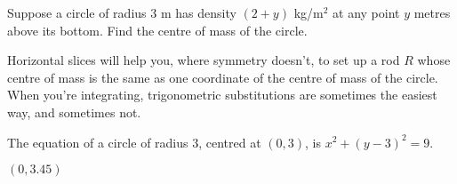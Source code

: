

\begin{question}
Suppose a circle of radius 3 m has density $(2+y)$ kg/m$^2$ at any point $y$ metres above its bottom. Find the centre of mass of the circle.
\begin{center}
\end{center}

\end{question}
\begin{hint}
Horizontal slices will help you, where symmetry doesn't, to set up a rod $R$ whose centre of mass is the same as one coordinate of the centre of mass of the circle. When you're integrating, trigonometric substitutions are sometimes the easiest way, and sometimes not.

The equation of a circle of radius 3, centred at $(0,3)$, is $x^2+(y-3)^2=9$.
\end{hint}
\begin{answer}
$(0,3.45)$
\end{answer}

